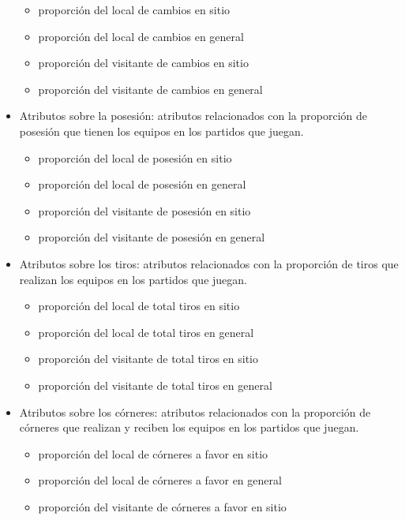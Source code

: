 \begin{itemize}
          \begin{itemize}
              \item proporción del local de cambios en sitio
              \item proporción del local de cambios en general
              \item proporción del visitante de cambios en sitio
              \item proporción del visitante de cambios en general
          \end{itemize}
    \item Atributos sobre la posesión: atributos relacionados con la proporción de posesión que tienen los equipos en los partidos que juegan.
          \begin{itemize}
              \item proporción del local de posesión en sitio
              \item proporción del local de posesión en general
              \item proporción del visitante de posesión en sitio
              \item proporción del visitante de posesión en general
          \end{itemize}
    \item Atributos sobre los tiros: atributos relacionados con la proporción de tiros que realizan los equipos en los partidos que juegan.
          \begin{itemize}
              \item proporción del local de total tiros en sitio
              \item proporción del local de total tiros en general
              \item proporción del visitante de total tiros en sitio
              \item proporción del visitante de total tiros en general
          \end{itemize}
    \item Atributos sobre los córneres: atributos relacionados con la proporción de córneres que realizan y reciben los equipos en los partidos que juegan.
          \begin{itemize}
              \item proporción del local de córneres a favor en sitio
              \item proporción del local de córneres a favor en general
              \item proporción del visitante de córneres a favor en sitio

\end{itemize}
\end{itemize}
